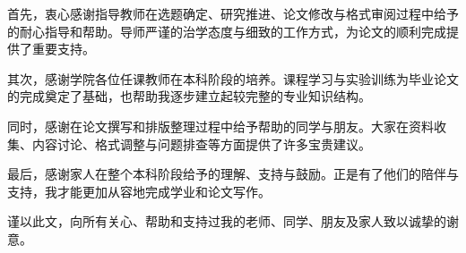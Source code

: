 
{\songti{}
首先，衷心感谢指导教师在选题确定、研究推进、论文修改与格式审阅过程中给予的耐心指导和帮助。导师严谨的治学态度与细致的工作方式，为论文的顺利完成提供了重要支持。

其次，感谢学院各位任课教师在本科阶段的培养。课程学习与实验训练为毕业论文的完成奠定了基础，也帮助我逐步建立起较完整的专业知识结构。

同时，感谢在论文撰写和排版整理过程中给予帮助的同学与朋友。大家在资料收集、内容讨论、格式调整与问题排查等方面提供了许多宝贵建议。

最后，感谢家人在整个本科阶段给予的理解、支持与鼓励。正是有了他们的陪伴与支持，我才能更加从容地完成学业和论文写作。

谨以此文，向所有关心、帮助和支持过我的老师、同学、朋友及家人致以诚挚的谢意。
}